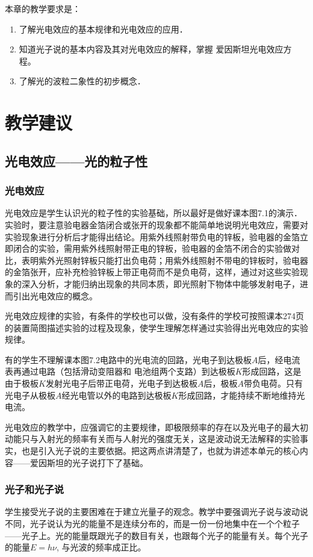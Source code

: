本章的教学要求是：
\begin{enumerate}
\item 了解光电效应的基本规律和光电效应的应用．
\item 知道光子说的基本内容及其对光电效应的解释，掌握
爱因斯坦光电效应方程。
\item 了解光的波粒二象性的初步概念．
\end{enumerate}


\section{教学建议}
\subsection{光电效应——光的粒子性}

\subsubsection{光电效应}

光电效应是学生认识光的粒子性的实验基础，所以最好是做好课本图7.1的演示．实验时，要注意验电器金箔闭合或张开的现象都不能简单地说明光电效应，需要对实验现象进行分析后才能得出结论。用紫外线照射带负电的锌板，验电器的金箔立即闭合的实验，需用紫外线照射带正电的锌板，验电器的金箔不闭合的实验做对比，表明紫外光照射锌板只能打出负电荷；用紫外线照射不带电的锌板时，验电器的金箔张开，应补充检验锌板上带正电荷而不是负电荷，这样，通过对这些实验现象的深入分析，才能归纳出现象的共同本质，即光照射下物体中能够发射电子，进而引出光电效应的概念。

光电效应规律的实验，有条件的学校也可以做，没有条件的学校可按照课本274页的装置简图描述实验的过程及现象，使学生理解怎样通过实验得出光电效应的实验规律。

有的学生不理解课本图7.2电路中的光电流的回路，光电子到达极板$A$后，经电流表再通过电路（包括滑动变阻器和
电池组两个支路）到达极板$K$形成回路，这是由于极板$K$发射光电子后带正电荷，光电子到达极板$A$后，极板$A$带负电荷。只有光电子从极板$A$经光电管以外的电路到达极板$K$形成回路，才能持续不断地维持光电流。

光电效应的教学中，应强调它的主要规律，即极限频率的存在以及光电子的最大初动能只与入射光的频率有关而与人射光的强度无关，这是波动说无法解释的实验事实，也是引入光子说的主要依据。把这两点讲清楚了，也就为讲述本单元的核心内容——爱因斯坦的光子说打下了基础。

\subsubsection{光子和光子说}
学生接受光子说的主要困难在于建立光量子的观念。教学中要强调光子说与波动说不同，光子说认为光的能量不是连续分布的，而是一份一份地集中在一个个粒子——光子上。光的能量既跟光子的数目有关，也跟每个光子的能量有关。每个光子的能量$E=h\nu$, 与光波的频率成正比。

